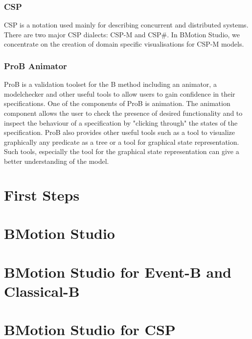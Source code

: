 \documentclass[twoside,10pt]{book}
\begin{document}
\subsection{CSP}
\label{csp}

CSP is a notation used mainly for describing concurrent and distributed systems.
There are two major CSP dialects: CSP-M and CSP\#.
In BMotion Studio, we concentrate on the creation of domain specific visualisations for CSP-M models.

\subsection{ProB Animator}
\label{prob_animator}

ProB is a validation toolset for the B method including an animator, a modelchecker and other useful tools to allow users to gain confidence in their specifications. One of the components of ProB is animation. The animation component allows the user to check the presence of desired functionality and to inspect the behaviour of a specification by "clicking through" the states of the specification. ProB also provides other useful tools such as a tool to visualize graphically any predicate as a tree or a tool for graphical state representation. Such tools, especially the tool for the graphical state representation can give a better understanding of the model.

\chapter{First Steps}
\label{first_steps}


\chapter{BMotion Studio}
\label{bms}


\chapter{BMotion Studio for Event-B and Classical-B}
\label{bms4b}


\chapter{BMotion Studio for CSP}
\label{bms4csp}




\clearpage
{}
{} 
\printindex
\end{document}
